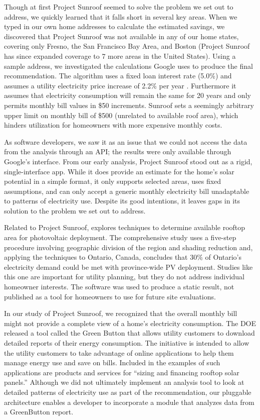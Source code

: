 \documentclass[pageno]{jpaper}
\begin{document}
Though at first Project Sunroof seemed to solve the problem we set out to address, we quickly learned that it falls short in several key areas. When we typed in our own home addresses to calculate the estimated savings, we discovered that Project Sunroof was not available in any of our home states, covering only Fresno, the San Francisco Bay Area, and Boston (Project Sunroof has since expanded coverage to 7 more areas in the United States). Using a sample address, we investigated the calculations Google uses to produce the final recommendation. The algorithm uses a fixed loan interest rate (5.0\%) and assumes a utility electricity price increase of 2.2\% per year \cite{Sunroof}. Furthermore it assumes that electricity consumption will remain the same for 20 years and only permits monthly bill values in \$50 increments. Sunroof sets a seemingly arbitrary upper limit on monthly bill of \$500 (unrelated to available roof area), which hinders utilization for homeowners with more expensive monthly costs. 

As software developers, we saw it as an issue that we could not access the data from the analysis through an API; the results were only available through Google's interface. From our early analysis, Project Sunroof stood out as a rigid, single-interface app. While it does provide an estimate for the home's solar potential in a simple format, it only supports selected areas, uses fixed assumptions, and can only accept a generic monthly electricity bill unadaptable to patterns of electricity use. Despite its good intentions, it leaves gaps in its solution to the problem we set out to address.

Related to Project Sunroof, \cite{Wiginton2010345} explores techniques to determine available rooftop area for photovoltaic deployment. The comprehensive study uses a five-step procedure involving geographic division of the region and shading reduction and, applying the techniques to Ontario, Canada, concludes that 30\% of Ontario's electricity demand could be met with province-wide PV deployment. Studies like this one are important for utility planning, but they do not address individual homeowner interests. The software was used to produce a static result, not published as a tool for homeowners to use for future site evaluations.

In our study of Project Sunroof, we recognized that the overall monthly bill might not provide a complete view of a home's electricity consumption. The DOE released a tool called the Green Button that allows utility customers to download detailed reports of their energy consumption. The initiative is intended to allow the utility customers to take advantage of online applications to help them manage energy use and save on bills. Included in the examples of such applications are products and services for ``sizing and financing rooftop solar panels.'' Although we did not ultimately implement an analysis tool to look at detailed patterns of electricity use as part of the recommendation, our pluggable architecture enables a developer to incorporate a module that analyzes data from a GreenButton report.
\end{document}
